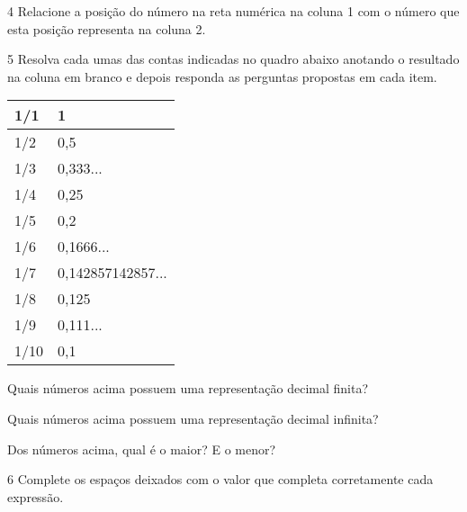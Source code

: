 {

\num{4} Relacione a posição do número na reta numérica na coluna 1 com o
número que esta posição representa na coluna 2.



\num{5} Resolva cada umas das contas indicadas no quadro abaixo anotando o
resultado na coluna em branco e depois responda as perguntas propostas
em cada item.

\begin{longtable}[]{@{}ll@{}}
\toprule
1/1 & 1\tabularnewline
\midrule
\endhead
1/2 & 0,5\tabularnewline
1/3 & 0,333...\tabularnewline
1/4 & 0,25\tabularnewline
1/5 & 0,2\tabularnewline
1/6 & 0,1666...\tabularnewline
1/7 & 0,142857142857...\tabularnewline
1/8 & 0,125\tabularnewline
1/9 & 0,111...\tabularnewline
1/10 & 0,1\tabularnewline
\bottomrule
\end{longtable}

\begin{escolha}
\item
  Quais números acima possuem uma representação decimal finita?


\item
  Quais números acima possuem uma representação decimal infinita?


\item
  Dos números acima, qual é o maior? E o menor?

\end{escolha}


\num{6} Complete os espaços deixados com o valor que completa corretamente
cada expressão.

}
